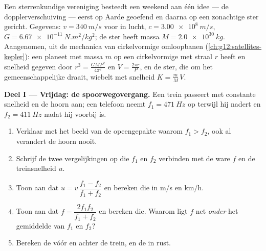 \begin{problem}
\label{pb:g12:doppler-effect:1}
Een sterrenkundige vereniging besteedt een weekend aan één idee --- de
dopplerverschuiving --- eerst op Aarde geoefend en daarna op een
zonachtige ster gericht. Gegevens: $v = \qty{340}{m/s}$ voor  in
lucht, $c = \qty{3.00e8}{m/s}$, $G = \qty{6.67e-11}{N.m^2/kg^2}$; de ster
heeft massa $M = \qty{2.0e30}{kg}$. Aangenomen, uit de mechanica van
cirkelvormige omloopbanen (\cref{ch:g12:satellites-kepler}): een planeet
met massa $m$ op een cirkelvormige  met straal $r$ heeft  en
snelheid gegeven door $r^3 = \frac{G M P^2}{4\pi^2}$ en
$V = \frac{2\pi r}{P}$, en de ster, die om het gemeenschappelijke
 draait, wiebelt met snelheid $K = \frac{m}{M}\,V$.

\medskip
\noindent\textbf{Deel I --- Vrijdag: de spoorwegovergang.}
Een trein passeert met constante snelheid en de hoorn aan; een telefoon
neemt $f_1 = \qty{471}{Hz}$ op terwijl hij nadert en $f_2 = \qty{411}{Hz}$
nadat hij voorbij is.
\begin{enumerate}
  \item Verklaar met het beeld van de opeengepakte  waarom
        $f_1 > f_2$, ook al verandert de hoorn nooit.
  \item Schrijf de twee vergelijkingen op die $f_1$ en $f_2$ verbinden met
        de ware  $f$ en de treinsnelheid $u$.
  \item Toon aan dat $u = v\,\dfrac{f_1 - f_2}{f_1 + f_2}$ en bereken die
        in \unit{m/s} en \unit{km/h}.
  \item Toon aan dat $f = \dfrac{2 f_1 f_2}{f_1 + f_2}$ en bereken die.
        Waarom ligt $f$ net \emph{onder} het gemiddelde van $f_1$ en
        $f_2$?
  \item Bereken de  vóór en achter de trein, en de 
        in rust.
\end{enumerate}


\end{problem}
